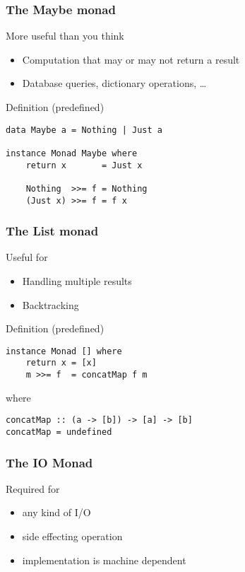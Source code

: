 \documentclass{beamer}
\begin{document}
\begin{frame}[fragile]
  \frametitle{The Maybe monad}
  \begin{block}{More useful than you think}
                \begin{itemize}         
                        \item Computation that may or may not return a result
                        \item Database queries, dictionary operations, \dots
                \end{itemize}   
                \end{block}     
\pause
\begin{block}{Definition (predefined)}
\begin{lstlisting}
data Maybe a = Nothing | Just a

instance Monad Maybe where
    return x       = Just x
    
    Nothing  >>= f = Nothing
    (Just x) >>= f = f x
\end{lstlisting}  
\end{block}
\end{frame}             

\begin{frame}[fragile]
  \frametitle{The List monad}
  \begin{block}{Useful for}
                \begin{itemize}         
                        \item Handling multiple results
                        \item Backtracking
                \end{itemize}   
                \end{block}     
\pause
\begin{block}{Definition (predefined)}
\begin{lstlisting}
instance Monad [] where
    return x = [x]
    m >>= f  = concatMap f m
\end{lstlisting}  
\end{block}
where 
\begin{lstlisting}
concatMap :: (a -> [b]) -> [a] -> [b]
concatMap = undefined
\end{lstlisting}
\end{frame}             

\begin{frame}[fragile]
  \frametitle{The IO Monad}
  \begin{block}{Required for}
  \begin{itemize}
        \item any kind of I/O
        \item side effecting operation
        \item implementation is machine dependent
  \end{itemize}
  \end{block}
\end{frame}
\end{document}
